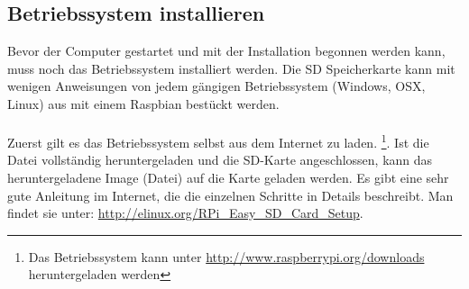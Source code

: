 \subsection{Betriebssystem installieren}
Bevor der Computer gestartet und mit der Installation begonnen werden kann, muss noch das Betriebssystem installiert werden.
Die SD Speicherkarte kann mit wenigen Anweisungen von jedem gängigen Betriebssystem (Windows, OSX, Linux) aus mit einem Raspbian bestückt werden.
\\
\\
Zuerst gilt es das Betriebssystem selbst aus dem Internet zu laden.
\footnote{Das Betriebssystem kann unter \url{http://www.raspberrypi.org/downloads} heruntergeladen werden}.
Ist die Datei vollständig heruntergeladen und die SD-Karte angeschlossen, kann das heruntergeladene Image (Datei) auf die Karte geladen werden.
Es gibt eine sehr gute Anleitung im Internet, die die einzelnen Schritte in Details beschreibt. Man findet sie unter: \url{http://elinux.org/RPi\_Easy\_SD\_Card\_Setup}.
